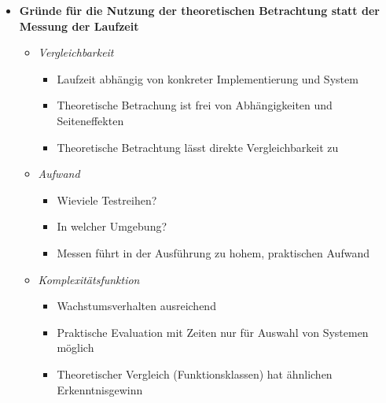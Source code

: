 \documentclass[
    ngerman,
    color=3b,
    load_common, %
    summary,
    boxarc,
]{tuda_summary}
\begin{document}
\begin{itemize}
    \item \textbf{Gründe für die Nutzung der theoretischen Betrachtung statt der Messung der Laufzeit }
          \begin{itemize}
              \item \textit{Vergleichbarkeit}
                    \begin{itemize}
                        \item Laufzeit abhängig von konkreter Implementierung und System
                        \item Theoretische Betrachung ist frei von Abhängigkeiten und Seiteneffekten
                        \item Theoretische Betrachtung lässt direkte Vergleichbarkeit zu
                    \end{itemize}

              \item \textit{Aufwand}
                    \begin{itemize}
                        \item Wieviele Testreihen?
                        \item In welcher Umgebung?
                        \item Messen führt in der Ausführung zu hohem, praktischen Aufwand
                    \end{itemize}

              \item \textit{Komplexitätsfunktion}
                    \begin{itemize}
                        \item Wachstumsverhalten ausreichend
                        \item Praktische Evaluation mit Zeiten nur für Auswahl von Systemen möglich
                        \item Theoretischer Vergleich (Funktionsklassen) hat ähnlichen Erkenntnisgewinn
                    \end{itemize}
          \end{itemize}
\end{itemize}
\clearpage
\end{document}
